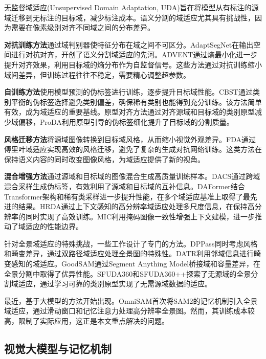无监督域适应(Unsupervised Domain Adaptation, UDA)旨在将模型从有标注的源域迁移到无标注的目标域，减少标注成本\cite{tsai2018learning,zou2018unsupervised}。语义分割的域适应尤其具有挑战性，因为需要在像素级别对齐不同域之间的分布差异。

\textbf{对抗训练方法}通过域判别器使特征分布在域之间不可区分。AdaptSegNet\cite{tsai2018adaptsegnet}在输出空间进行对抗对齐，开创了语义分割域适应的先河。ADVENT\cite{vu2019advent}通过熵最小化进一步提升对齐效果，利用目标域的熵分布作为自监督信号。这些方法通过对抗训练缩小域间差异，但训练过程往往不稳定，需要精心调整超参数。

\textbf{自训练方法}使用模型预测的伪标签进行训练，逐步提升目标域性能。CBST\cite{zou2018cbst}通过类别平衡的伪标签选择避免类别偏差，确保稀有类别也能得到充分训练。该方法简单有效，成为域适应的重要基线。原型对齐方法\cite{zhang2021prototypical}通过对齐源域和目标域的类别原型减少域偏移，ProDA利用原型引导的伪标签细化提升了目标域的分割质量。

\textbf{风格迁移方法}将源域图像转换到目标域风格，从而缩小视觉外观差异。FDA通过傅里叶域适应实现高效的风格迁移，避免了复杂的生成对抗网络训练。这类方法在保持语义内容的同时改变图像风格，为域适应提供了新的视角。

\textbf{混合增强方法}通过源域和目标域的图像混合生成高质量训练样本。DACS\cite{tranheden2021dacs}通过跨域混合采样生成伪标签，有效利用了源域和目标域的互补信息。DAFormer\cite{hoyer2022daformer}结合Transformer架构和稀有类采样进一步提升性能，在多个域适应基准上取得了最先进的结果。HRDA\cite{hoyer2022hrda}通过上下文感知的高分辨率域适应处理多尺度信息，在保持高分辨率的同时实现了高效训练。MIC\cite{hoyer2023mic}利用掩码图像一致性增强上下文建模，进一步推动了域适应的性能边界。

针对全景域适应的特殊挑战，一些工作设计了专门的方法。DPPass\cite{zheng2023dppass}同时考虑风格和畸变差异，通过双路径域适应处理全景图的特殊性。DATR\cite{zheng2023datr}利用邻域信息进行畸变感知的域适应。GoodSAM\cite{zhang2024goodsam}通过Segment Anything Model桥接域和容量差异，在全景分割中取得了优异性能。SFUDA360\cite{zheng2024sfuda360}和SFUDA360++\cite{zheng2025sfuda360pp}探索了无源域的全景分割域适应，通过学习可靠的类别原型实现了无需源域数据的适应。

最近，基于大模型的方法开始出现。OmniSAM\cite{zhong2025omnisam}首次将SAM2的记忆机制引入全景域适应，通过滑动窗口和记忆注意力处理高分辨率全景图。然而，其训练成本较高，限制了实际应用，这正是本文重点解决的问题。

\subsection{视觉大模型与记忆机制}

